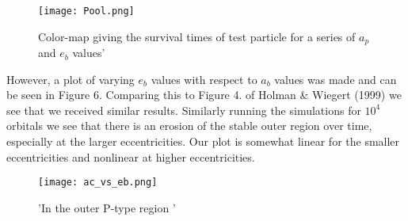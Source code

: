\documentclass{article}
\begin{document}
\begin{figure}[htbp]
\texttt{[image: Pool.png]}
\caption{Color-map giving the survival times of test particle for a series of $a_p$ and $e_b$ values'}
\end{figure}

However, a plot of varying $e_b$ values with respect to $a_b$ values was made and can be seen in Figure 6. Comparing this to Figure 4. of Holman & Wiegert (1999) we see that we received similar results. Similarly running the simulations for $10^4$ orbitals we see that there is an erosion of the stable outer region over time, especially at the larger eccentricities. Our plot is somewhat linear for the smaller eccentricities and nonlinear at higher eccentricities. 


\begin{figure}[htbp]
\texttt{[image: ac\_vs\_eb.png]}
\caption{'In the outer P-type region '}
\end{figure}
\end{document}
